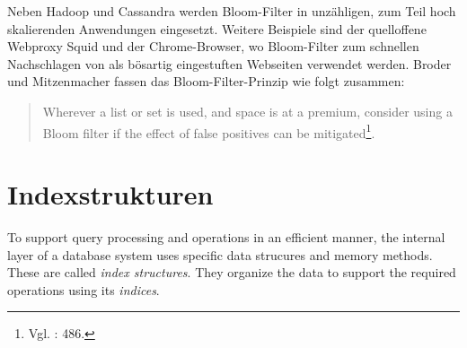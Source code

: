 \noindent
Neben Hadoop und Cassandra werden Bloom-Filter in unzähligen, zum Teil hoch skalierenden Anwendungen eingesetzt. Weitere Beispiele sind der quelloffene Webproxy Squid und der Chrome-Browser, wo Bloom-Filter zum schnellen Nachschlagen von als bösartig eingestuften Webseiten verwendet werden. Broder und Mitzenmacher fassen das Bloom-Filter-Prinzip wie folgt zusammen: 
\begin{quote}
Wherever a list or set is used, and space is at a premium, consider using a Bloom filter if the effect of false positives can be mitigated\footnote{Vgl. \cite{Broder2004}: 486.}.
\end{quote}
\section{Indexstrukturen}\label{sec:indexstrukturen}
To support query processing and operations in an efficient manner, the internal layer of a database system uses specific data strucures and memory methods. These are called \textit{index structures}. They organize the data to support the required operations using its \textit{indices}.

